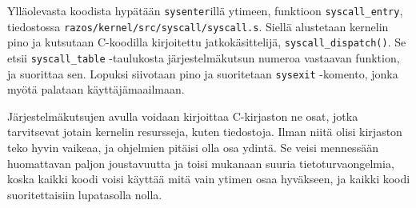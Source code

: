 Ylläolevasta koodista hypätään \texttt{sysenter}illä ytimeen, funktioon \texttt{syscall\_entry}, tiedostossa \texttt{razos/kernel/src/syscall/syscall.s}. Siellä alustetaan kernelin pino ja kutsutaan C-koodilla kirjoitettu jatkokäsittelijä, \texttt{syscall\_dispatch()}. Se etsii \texttt{syscall\_table} -taulukosta järjestelmäkutsun numeroa vastaavan funktion, ja suorittaa sen. Lopuksi siivotaan pino ja suoritetaan \texttt{sysexit} -komento, jonka myötä palataan käyttäjämaailmaan.

\par

Järjestelmäkutsujen avulla voidaan kirjoittaa C-kirjaston ne osat, jotka tarvitsevat jotain kernelin resursseja, kuten tiedostoja. Ilman niitä olisi kirjaston teko hyvin vaikeaa, ja ohjelmien pitäisi olla osa ydintä. Se veisi mennessään huomattavan paljon joustavuutta ja toisi mukanaan suuria tietoturvaongelmia, koska kaikki koodi voisi käyttää mitä vain ytimen osaa hyväkseen, ja kaikki koodi suoritettaisiin lupatasolla nolla.